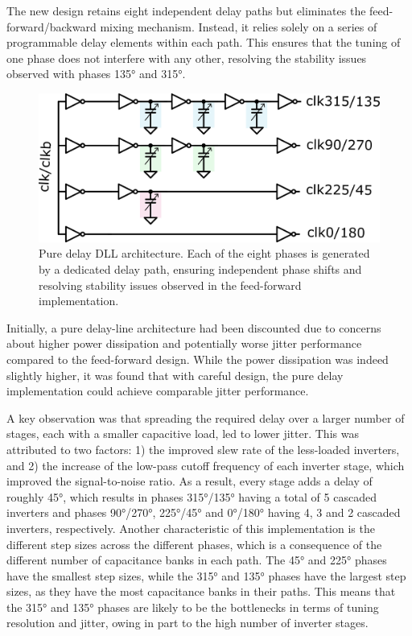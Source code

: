 The new design retains eight independent delay paths but eliminates the feed-forward/backward mixing mechanism. Instead, it relies solely on a series of programmable delay elements within each path. This ensures that the tuning of one phase does not interfere with any other, resolving the stability issues observed with phases \ang{135} and \ang{315}.

\begin{figure}[htbp]
  \centering
  \includegraphics[width=0.7\linewidth]{figures/Schematics/pure_delay.png}
  \caption{Pure delay DLL architecture. Each of the eight phases is generated by a dedicated delay path, ensuring independent phase shifts and resolving stability issues observed in the feed-forward implementation.}
  \label{fig:pure_delay}
\end{figure}


Initially, a pure delay-line architecture had been discounted due to concerns about higher power dissipation and potentially worse jitter performance compared to the feed-forward design. While the power dissipation was indeed slightly higher, it was found that with careful design, the pure delay implementation could achieve comparable jitter performance.

A key observation was that spreading the required delay over a larger number of stages, each with a smaller capacitive load, led to lower jitter. This was attributed to two factors: 1) the improved slew rate of the less-loaded inverters, and 2) the increase of the low-pass cutoff frequency of each inverter stage, which improved the signal-to-noise ratio. As a result, every stage adds a delay of roughly \ang{45}, which results in phases \ang{315}/\ang{135} having a total of 5 cascaded inverters and phases \ang{90}/\ang{270}, \ang{225}/\ang{45} and \ang{0}/\ang{180} having 4, 3 and 2 cascaded inverters, respectively.
Another characteristic of this implementation is the different step sizes across the different phases, which is a consequence of the different number of capacitance banks in each path. The \ang{45} and \ang{225} phases have the smallest step sizes, while the \ang{315} and \ang{135} phases have the largest step sizes, as they have the most capacitance banks in their paths. This means that the \ang{315} and \ang{135} phases are likely to be the bottlenecks in terms of tuning resolution and jitter, owing in part to the high number of inverter stages.

